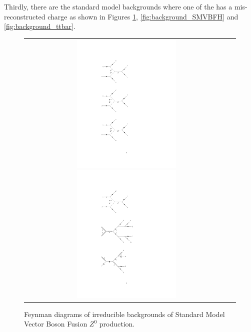 Thirdly, there are the standard model backgrounds where one of the \hadtau has a mis-reconstructed charge as shown in Figures \ref{fig:background_SMVBFZ0}, \ref{fig:background_SMVBFH} and \ref{fig:background_ttbar}. 

\begin{figure}[tbh!]
	\centering
	\begin{tabular}{cc}
		\includegraphics[width=0.50\textwidth]{diagrams/pics/background_SMVBFZ0Z0.pdf}
		\includegraphics[width=0.50\textwidth]{diagrams/pics/background_SMVBFZ0W.pdf} 		
	\end{tabular}
	\caption{Feynman diagrams of irreducible backgrounds of Standard Model Vector Boson Fusion $Z^{0}$ production. }
	\label{fig:background_SMVBFZ0}
\end{figure}

